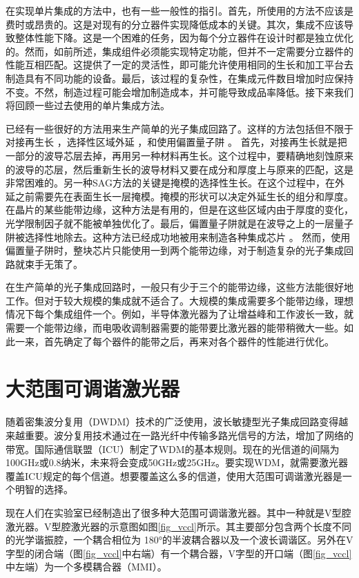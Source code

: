 \documentclass{ZJUthesis}
\begin{document}
在实现单片集成的方法中，也有一些一般性的指引。首先，所使用的方法不应该是费时或昂贵的。这是对现有的分立器件实现降低成本的关键。其次，集成不应该导致整体性能下降。这是一个困难的任务，因为每个分立器件在设计时都是独立优化的。然而，如前所述，集成组件必须能实现特定功能，但并不一定需要分立器件的性能互相匹配。这提供了一定的灵活性，即可能允许使用相同的生长和加工平台去制造具有不同功能的设备。最后，该过程的复杂性，在集成元件数目增加时应保持不变。不然，制造过程可能会增加制造成本，并可能导致成品率降低。接下来我们将回顾一些过去使用的单片集成方法。

已经有一些很好的方法用来生产简单的光子集成回路了。这样的方法包括但不限于对接再生长 \cite{binsma1997characterization-BJR}，选择性区域外延 \cite{aoki1993ingaas-SAG}，和使用偏置量子阱 \cite{mason1999widely-offset}。 首先，对接再生长就是把一部分的波导芯层去掉，再用另一种材料再生长。这个过程中，要精确地刻蚀原来的波导的芯层，然后重新生长的波导材料又要在成分和厚度上与原来的匹配，这是非常困难的。另一种SAG方法的关键是掩模的选择性生长。在这个过程中，在外延之前需要先在表面生长一层掩模。掩模的形状可以决定外延生长的组分和厚度。在晶片的某些能带边缘，这种方法是有用的，但是在这些区域内由于厚度的变化，光学限制因子就不能被单独优化了。最后，偏置量子阱就是在波导之上的一层量子阱被选择性地除去。这种方法已经成功地被用来制造各种集成芯片 \cite{mason1999widely-offset} \cite{mason2000design-offset} \cite{mason1998tunable-offset} \cite{fish1998compact-offset}。 然而，使用偏置量子阱时，整块芯片只能使用一到两个能带边缘，对于制造复杂的光子集成回路就束手无策了。

在生产简单的光子集成回路时，一般只有少于三个的能带边缘，这些方法能很好地工作。但对于较大规模的集成就不适合了。大规模的集成需要多个能带边缘，理想情况下每个集成组件一个。例如，半导体激光器为了让增益峰和工作波长一致，就需要一个能带边缘，而电吸收调制器需要的能带要比激光器的能带稍微大一些。如此一来，首先确定了每个器件的能带之后，再来对各个器件的性能进行优化。

\section{大范围可调谐激光器}

随着密集波分复用（DWDM）技术的广泛使用，波长敏捷型光子集成回路变得越来越重要。波分复用技术通过在一路光纤中传输多路光信号的方法，增加了网络的带宽。国际通信联盟（ICU）制定了WDM的基本规则。现在的光信道的间隔为100GHz或0.8纳米，未来将会变成50GHz或25GHz。要实现WDM，就需要激光器覆盖ICU规定的每个信道。想要覆盖这么多的信道，使用大范围可调谐激光器是一个明智的选择。

现在人们在实验室已经制造出了很多种大范围可调谐激光器。其中一种就是V型腔激光器。V型腔激光器的示意图如图\ref{fig_vccl}所示。其主要部分包含两个长度不同的光学谐振腔，一个耦合相位为 180°的半波耦合器以及一个波长调谐区。另外在V字型的闭合端（图\ref{fig_vccl}中右端）有一个耦合器，V字型的开口端（图\ref{fig_vccl} 中左端）为一个多模耦合器（MMI）。
\end{document}
